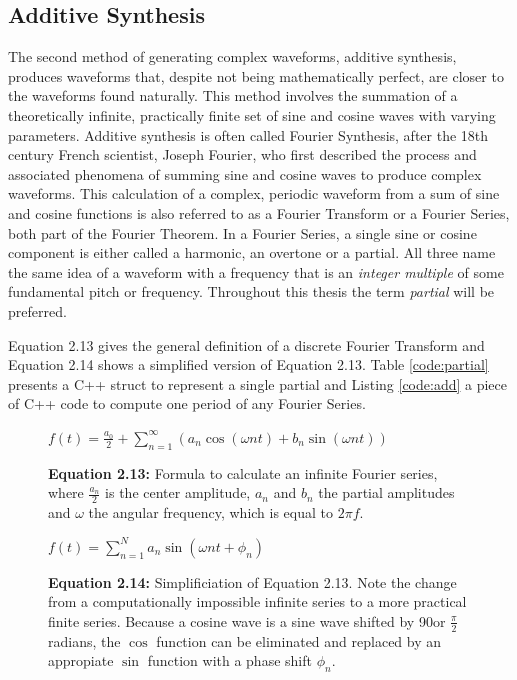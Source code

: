 \begin{table}
\end{table}

\pagebreak

\subsection{Additive Synthesis}

The second method of generating complex waveforms, additive synthesis, produces waveforms that, despite not being mathematically perfect, are closer to the waveforms found naturally. This method involves the summation of a theoretically infinite, practically finite set of sine and cosine waves with varying parameters. Additive synthesis is often called Fourier Synthesis, after the 18th century French scientist, Joseph Fourier, who first described the process and associated phenomena of summing sine and cosine waves to produce complex waveforms. This calculation of a complex, periodic waveform from a sum of sine and cosine functions is also referred to as a Fourier Transform or a Fourier Series, both part of the Fourier Theorem. In a Fourier Series, a single sine or cosine component is either called a harmonic, an overtone or a partial. All three name the same idea of a waveform with a frequency that is an \emph{integer multiple} of some fundamental pitch or frequency.  Throughout this thesis the term \emph{partial} will be preferred. 

Equation 2.13 gives the general definition of a discrete Fourier Transform and Equation 2.14 shows a simplified version of Equation 2.13. Table \ref{code:partial} presents a C++ struct to represent a single partial and Listing \ref{code:add} a piece of C++ code to compute one period of any Fourier Series.

\begin{figure}[h!]
  $f(t) = \frac{a_{0}}{2} + \sum\limits_{n=1}^\infty (a_{n} \cos(\omega n t) + b_{n} \sin(\omega n t))$
  \caption*{\textbf{Equation 2.13: }Formula to calculate an infinite Fourier series, where $\frac{a_{n}}{2}$ is the center amplitude, $a_{n}$ and $b_{n}$ the partial amplitudes and $\omega$ the angular frequency, which is equal to $2 \pi f$.}
  \label{fig:fourier1}
\end{figure}

\begin{figure}[h!]
  $f(t) = \sum\limits_{n=1}^N a_{n} \sin(\omega n t + \phi_{n})$
  \caption*{\textbf{Equation 2.14:} Simplificiation of Equation 2.13. Note the change from a computationally impossible infinite series to a more practical finite series. Because a cosine wave is a sine wave shifted by 90\degree or $\frac{\pi}{2}$ radians, the $\cos$ function can be eliminated and replaced by an appropiate $\sin$ function with a phase shift $\phi_{n}$.}
  \label{fig:fourier2}
\end{figure}

